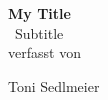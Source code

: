 \thispagestyle{empty}
\begin{titlepage}

\begin{center}
\huge
\textbf{My Title}\\[1cm]

\Large
 ~Subtitle \\[1cm]

\large
verfasst von

\Large
Toni Sedlmeier\\[0.5cm]

\end{center}
\end{titlepage}
